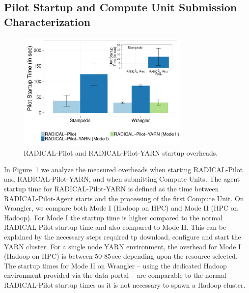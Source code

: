 \subsection{Pilot Startup and Compute Unit Submission Characterization}
\label{ssec:startup_pilot_unit}

\begin{figure}[t]
    \centering
    \includegraphics[width=0.75\textwidth]{figures/data_analytics_hpc/hpc_hadoop/pilot_unit_startup.pdf}
    \caption{RADICAL-Pilot and RADICAL-Pilot-YARN startup overheads.
        \label{fig:startup_yarn}}
\end{figure}

In Figure~\ref{fig:startup_yarn} we analyze the measured overheads when starting RADICAL-Pilot and RADICAL-Pilot-YARN, and when submitting Compute Units.
The agent startup time for RADICAL-Pilot-YARN is defined as the time between RADICAL-Pilot-Agent starts and the processing of the first Compute Unit.
On Wrangler, we compare both Mode I (Hadoop on HPC) and Mode II (HPC on Hadoop).
For Mode I the startup time is higher compared to the normal RADICAL-Pilot startup time and also compared to Mode II.
This can be explained by the necessary steps required tp download, configure and start the YARN cluster.
For a single node YARN environment, the overhead for Mode I (Hadoop on HPC) is between 50-85\,sec depending upon the resource selected.
The startup times for Mode II on Wrangler -- using the dedicated Hadoop environment provided via the data portal -- are comparable to the normal RADICAL-Pilot startup times as it is not necessary to spawn a Hadoop cluster.

